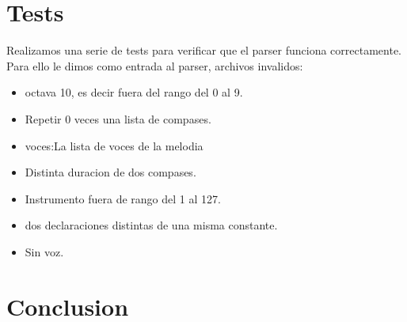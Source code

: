 \documentclass[a4paper]{article}
\begin{document}
\section{Tests}

Realizamos una serie de tests para verificar que el parser funciona correctamente. Para ello le dimos como entrada al parser, archivos invalidos:

\begin{itemize}

\item octava 10, es decir fuera del rango del 0 al 9.
\item Repetir 0 veces una lista de compases.
\item voces:La lista de voces de la melodia
\item Distinta duracion de dos compases.
\item Instrumento fuera de rango del 1 al 127.
\item dos declaraciones distintas de una misma constante.
\item Sin voz.

\end{itemize}


\section{Conclusion}
\end{document}
